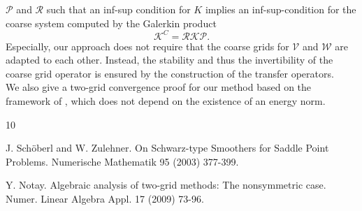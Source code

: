 \documentclass{report}
\begin{document}
$\mathcal{P}$ and $\mathcal{R}$ such that an inf-sup condition for $K$
implies an inf-sup-condition for the coarse system computed by the
Galerkin product
\begin{equation*}
\mathcal{K}^C = \mathcal{R} \mathcal{K} \mathcal{P}.
\end{equation*}
Especially, our approach does not require that the coarse grids for
$\mathcal{V}$ and $\mathcal{W}$ are adapted to each other. Instead,
the stability and thus the invertibility of the coarse grid operator is ensured by the
construction of the transfer operators.\\
We also give a two-grid convergence proof for our method based
on the framework of \cite{Notay:2009}, which does not depend on the
existence of an energy norm.

\begin{thebibliography}{10}

{\sc J. Sch\"oberl and W. Zulehner}. {On Schwarz-type Smoothers for
Saddle Point Problems}. Numerische Mathematik 95 (2003) 377-399.

{\sc Y. Notay}. {Algebraic analysis of two-grid methods: The nonsymmetric
case}. Numer. Linear Algebra Appl. 17 (2009) 73-96.

\end{thebibliography}
\end{document}
